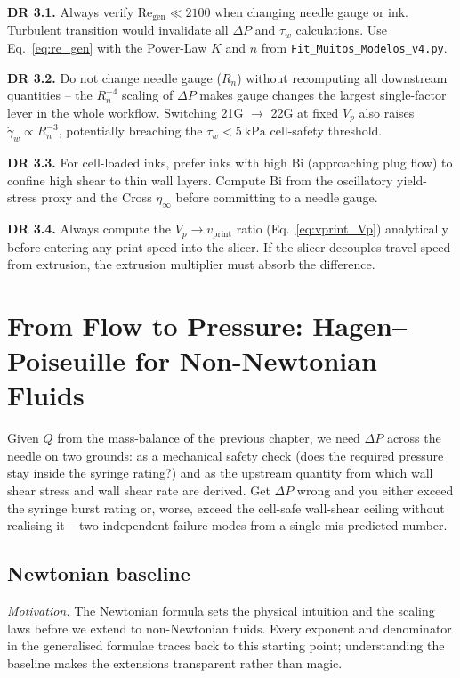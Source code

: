 \documentclass[11pt,a4paper]{article}
\newcommand{\gd}{\dot{\gamma}}
\newcommand{\Bi}{\mathrm{Bi}}
\newcommand{\Rey}{\mathrm{Re}}
\begin{document}
\begin{designrulebox}
\textbf{DR 3.1.} Always verify $\Rey_\mathrm{gen}\ll 2100$ when changing
needle gauge or ink. Turbulent transition would invalidate all $\Delta P$
and $\tau_w$ calculations. Use Eq.~\ref{eq:re_gen} with the Power-Law
$K$ and $n$ from \texttt{Fit\_Muitos\_Modelos\_v4.py}.

\textbf{DR 3.2.} Do not change needle gauge ($R_n$) without recomputing
all downstream quantities -- the $R_n^{-4}$ scaling of $\Delta P$ makes
gauge changes the largest single-factor lever in the whole workflow.
Switching 21G $\to$ 22G at fixed $V_p$ also raises $\gd_w\propto R_n^{-3}$,
potentially breaching the $\tau_w<\SI{5}{\kPa}$ cell-safety threshold.

\textbf{DR 3.3.} For cell-loaded inks, prefer inks with high $\Bi$
(approaching plug flow) to confine high shear to thin wall layers.
Compute $\Bi$ from the oscillatory yield-stress proxy and the Cross
$\eta_\infty$ before committing to a needle gauge.

\textbf{DR 3.4.} Always compute the $V_p\to v_\mathrm{print}$ ratio
(Eq.~\ref{eq:vprint_Vp}) analytically before entering any print speed
into the slicer. If the slicer decouples travel speed from extrusion,
the extrusion multiplier must absorb the difference.
\end{designrulebox}

\section{From Flow to Pressure: Hagen--Poiseuille for Non-Newtonian Fluids}
\label{sec:HP}

Given $Q$ from the mass-balance of the previous chapter, we need $\Delta P$
across the needle on two grounds: as a mechanical safety check (does the
required pressure stay inside the syringe rating?) and as the upstream
quantity from which wall shear stress and wall shear rate are derived. Get
$\Delta P$ wrong and you either exceed the syringe burst rating or, worse,
exceed the cell-safe wall-shear ceiling without realising it -- two
independent failure modes from a single mis-predicted number.

\subsection{Newtonian baseline}

\emph{Motivation.} The Newtonian formula sets the physical intuition and the
scaling laws before we extend to non-Newtonian fluids. Every exponent and
denominator in the generalised formulae traces back to this starting point;
understanding the baseline makes the extensions transparent rather than magic.
\end{document}
